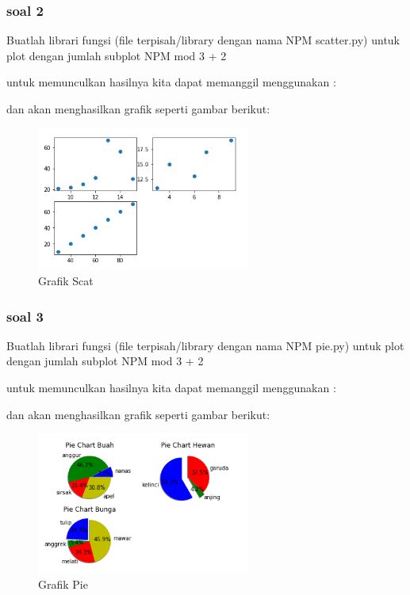 \subsubsection{soal 2}
Buatlah librari fungsi (ﬁle terpisah/library dengan nama NPM scatter.py) untuk plot dengan jumlah subplot NPM mod 3 + 2

untuk memunculkan hasilnya kita dapat memanggil menggunakan :


dan akan menghasilkan grafik seperti gambar berikut:
\begin{figure}[H]
\centering
\includegraphics[width=7cm]{figures/6/1174003/p2.png}
\caption{Grafik Scat}
\label{dwisep}
\end{figure}


\subsubsection{soal 3}
Buatlah librari fungsi (ﬁle terpisah/library dengan nama NPM pie.py) untuk plot dengan jumlah subplot NPM mod 3 + 2

untuk memunculkan hasilnya kita dapat memanggil menggunakan :


dan akan menghasilkan grafik seperti gambar berikut:
\begin{figure}[H]
\centering
\includegraphics[width=7cm]{figures/6/1174003/p3.png}
\caption{Grafik Pie}
\label{dwisep}
\end{figure}


